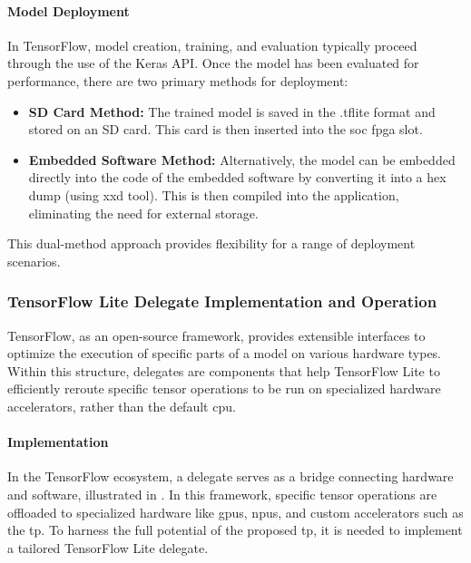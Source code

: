 \paragraph{Model Deployment}

In TensorFlow, model creation, training, and evaluation typically proceed through the use of the Keras API. Once the model has been evaluated for performance, there are two primary methods for deployment:

\begin{itemize}
	\item \textbf{SD Card Method:} The trained model is saved in the .tflite format and stored on an SD card. This card is then inserted into the \gls{soc} \gls{fpga} slot.
	
	\item \textbf{Embedded Software Method:} Alternatively, the model can be embedded directly into the code of the embedded software by converting it into a hex dump (using xxd tool). This is then compiled into the application, eliminating the need for external storage.
\end{itemize}

This dual-method approach provides flexibility for a range of deployment scenarios.


\subsubsection{TensorFlow Lite Delegate Implementation and Operation}
TensorFlow, as an open-source framework, provides extensible interfaces to optimize the execution of specific parts of a model on various hardware types. Within this structure, delegates are components that help TensorFlow Lite to efficiently reroute specific tensor operations to be run on specialized hardware accelerators, rather than the default \gls{cpu}.


\paragraph{Implementation}

In the TensorFlow ecosystem, a delegate serves as a bridge connecting hardware and software, illustrated in . In this framework, specific tensor operations are offloaded to specialized hardware like \glspl{gpu}, \glspl{npu}, and custom accelerators such as the \gls{tp}. To harness the full potential of the proposed \gls{tp}, it is needed to implement a tailored TensorFlow Lite delegate.

